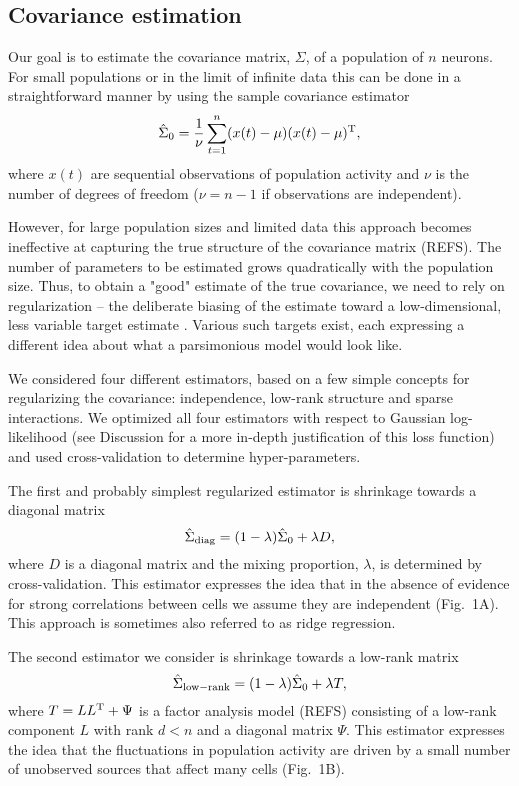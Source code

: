 
\subsection*{Covariance estimation}

Our goal is to estimate the covariance matrix, $\Sigma$, of a population of $n$ neurons. For small populations or in the limit of infinite data this can be done in a straightforward manner by using the sample covariance estimator
\begin{equation}
\hat \Sigma_0 = \frac 1 \nu \sum\limits_{t=1}^n (x(t)-\mu)(x(t)-\mu)^{\rm T}, 
\end{equation}
where $x(t)$ are sequential observations of population activity and $\nu$ is the number of degrees of freedom ($\nu=n-1$ if observations are independent).

However, for large population sizes and limited data this approach becomes ineffective at capturing the true structure of the covariance matrix (REFS). The number of parameters to be estimated grows quadratically with the population size. Thus, to obtain a "good" estimate of the true covariance, we need to rely on regularization -- the deliberate biasing of the estimate toward a low-dimensional, less variable target estimate \cite{Bickel:2006,Ledoit:2004}. Various such targets exist, each expressing a different idea about what a parsimonious model would look like. 

We considered four different estimators, based on a few simple concepts for regularizing the covariance: independence, low-rank structure and sparse interactions. We optimized all four estimators with respect to Gaussian log-likelihood (see Discussion for a more in-depth justification of this loss function) and used cross-validation to determine hyper-parameters.

The first and probably simplest regularized estimator is shrinkage towards a diagonal matrix
\begin{equation}
\hat \Sigma_{\rm diag} = (1-\lambda) \hat \Sigma_0 + \lambda D,
\end{equation}
where $D$ is a diagonal matrix and the mixing proportion, $\lambda$, is determined by cross-validation. This estimator expresses the idea that in the absence of evidence for strong correlations between cells we assume they are independent (Fig.~1A). This approach is sometimes also referred to as ridge regression. 

The second estimator we consider is shrinkage towards a low-rank matrix
\begin{equation}
\hat \Sigma_{\rm low-rank} = (1-\lambda) \hat \Sigma_0 + \lambda T,
\end{equation}
where $T = LL^{\rm T} + \Psi$ is a factor analysis model (REFS) consisting of a low-rank component $L$ with rank $d < n$ and a diagonal matrix $\Psi$. This estimator expresses the idea that the fluctuations in population activity are driven by a small number of unobserved sources that affect many cells (Fig.~1B). 

